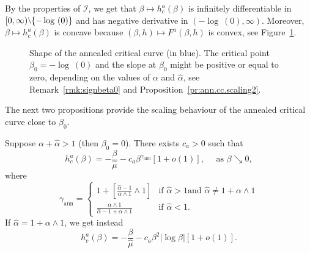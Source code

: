 \documentclass[AHL,Unicode,longabstracts]{cedram}
\newcommand{\cI}{{\ensuremath{\mathcal I}}}
\newcommand{\ga}{\alpha}
\newcommand{\gb}{\beta}
\newcommand{\ha}{\hat\ga}
\newcommand{\hmu}{\hat \mu}
\newcommand{\gann}{\gamma_{\mathrm{ann}}}
\newcommand{\sm}{{\raise0.3ex\hbox{$\scriptstyle \setminus$}}}
\begin{document}
By the properties of $\cI$, we get that $\gb \mapsto h_c^a(\gb)$ is infinitely differentiable in $[0,\infty) \sm \{- \log~(0)\}$ and has negative derivative in $(- \log~(0),\infty)$. Moreover, $\gb \mapsto h_c^a(\gb)$ is concave because $(\gb,h) \mapsto F^a(\gb,h)$ is convex, see Figure~\ref{fig.ann.cc}.

\begin{figure}
\begin{center}
\end{center}
\caption{\label{fig.ann.cc}
Shape of the annealed critical curve (in blue). The critical point $\gb_0 = -\log~(0)$ and the slope at $\gb_0$ might be positive or equal to zero, depending on the values of $\ga$ and $\hat\ga$, see Remark~\ref{rmk:signbeta0} and Proposition~\ref{pr:ann.cc.scaling2}.}
\end{figure}

The next two propositions provide the scaling behaviour of the annealed critical curve close to $\gb_0$.

\begin{prop}\label{pr:ann.cc.scaling}
Suppose $\ga + \ha > 1$ (then $\gb_0 = 0$). There exists $c_a > 0$ such that
\begin{equation}
h_c^a(\gb) = - \frac{\gb}{\hmu} - c_a \gb^{\gann}[1 + o(1)], \quad \text{ as }\gb \searrow 0,
\end{equation}
where
\begin{equation}\label{eq:defgann}
\gann =
\begin{cases}
1 + \left[\frac{\ha -1}{\ga \wedge 1} \wedge 1 \right] & \text{if } \ha > 1 \text{and } \ha \neq 1 + \ga \wedge 1\\[0.3em]
\frac{\ga \wedge 1}{\ha -1 + \ga \wedge 1} & \text{if } \ha < 1.
\end{cases}
\end{equation}
If $\ha = 1 + \ga \wedge 1$, we get instead
\begin{equation}
h_c^a(\gb) = - \frac{\gb}{\hmu} - c_a \gb^2 |{\log \gb}|[1 + o(1)].
\end{equation}
\end{prop}
\end{document}
